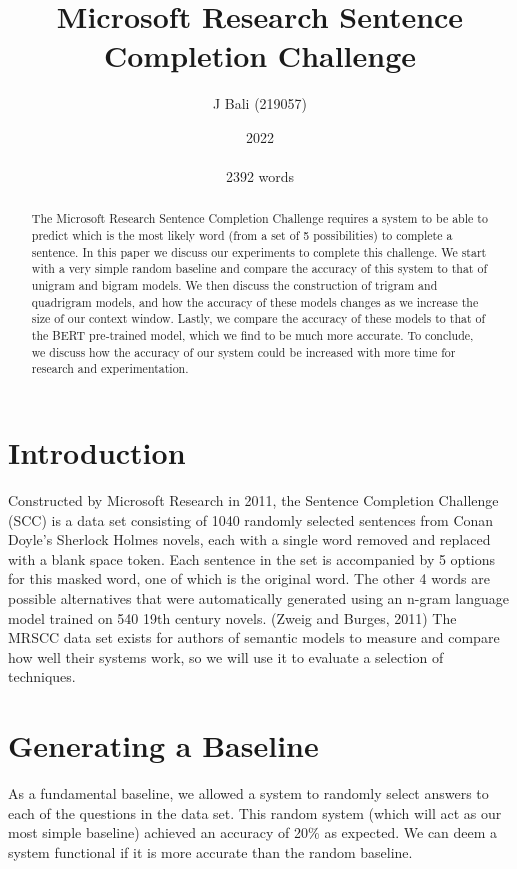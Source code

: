 \documentclass{article}
\title{Microsoft Research Sentence Completion Challenge}
\author{J Bali (219057)}
\date{2022\\ 
\\
2392 words}
\begin{document}
\maketitle

\begin{abstract}
The Microsoft Research Sentence Completion Challenge requires a system to  be able to predict which is the most likely word (from a set of 5 possibilities) to complete a sentence. In this paper we discuss our experiments to complete this challenge. We start with a very simple random baseline and compare the accuracy of this system to that of unigram and bigram models. We then discuss the construction of trigram and quadrigram models, and how the accuracy of these models changes as we increase the size of our context window. Lastly, we compare the accuracy of these models to that of the BERT pre-trained model, which we find to be much more accurate. To conclude, we discuss how the accuracy of our system could be increased with more time for research and experimentation.
\end{abstract}

\newpage

\section{Introduction}
Constructed by Microsoft Research in 2011, the Sentence Completion Challenge (SCC) is a data set consisting of 1040 randomly selected sentences from Conan Doyle's Sherlock Holmes novels, each with a single word removed and replaced with a blank space token. Each sentence in the set is accompanied by 5 options for this masked word, one of which is the original word. The other 4 words are possible alternatives that were automatically generated using an n-gram language model trained on 540 19th century novels. (Zweig and Burges, 2011) The MRSCC data set exists for authors of semantic models to measure and compare how well their systems work, so we will use it to evaluate a selection of techniques.

\section{Generating a Baseline}
As a fundamental baseline, we allowed a system to randomly select answers to each of the questions in the data set. This random system (which will act as our most simple baseline) achieved an accuracy of 20\% as expected. We can deem a system functional if it is more accurate than the random baseline.
\end{document}
